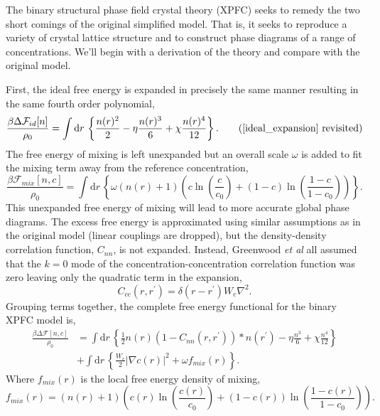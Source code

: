 \documentclass[showkeys, prb, reprint]{revtex4-1}
\renewcommand{\d}{\delta}       %
\newcommand{\F}{\mathcal{F}}    %
\renewcommand{\l}{\left}        %
\renewcommand{\r}{\right}       %
\newcommand{\f}{\frac}          %
\newcommand{\integrate}[1]{\int \mathrm{d}#1\,}
\begin{document}
The binary structural phase field crystal theory (XPFC) seeks to remedy the two
short comings of the original simplified model. That is, it seeks to reproduce
a variety of crystal lattice structure and to construct  phase diagrams of a
range of concentrations. We'll begin with a derivation of the theory and
compare with the original model.

First, the ideal free energy is expanded in precisely the same manner resulting
in the same fourth order polynomial,
%
\begin{equation}
    \f{\beta\Delta\F_{id}[n]}{\rho_0} = \integrate{r}
        \l\lbrace \f{n(r)^2}{2} - \eta \f{n(r)^3}{6} + \chi\f{n(r)^4}{12}
        \r\rbrace. \tag{\ref{ideal_expansion} revisited}
\end{equation}
%
The free energy of mixing is left unexpanded but an overall scale $\omega$ is
added to fit the mixing term away from the reference concentration,
%
\begin{equation}
    \f{\beta\F_{mix}[n, c]}{\rho_0} =
        \integrate{r} \l\lbrace \omega (n(r) + 1)\l( 
            c\ln\l(\f{c}{c_0}\r) + (1-c)\ln\l(\f{1-c}{1-c_0}\r) \r)\r\rbrace. 
\end{equation}
%
This unexpanded free energy of mixing will lead to more accurate global phase
diagrams. The excess free energy is approximated using similar assumptions as
in the original model (linear couplings are dropped), but the density-density
correlation function, $C_{nn}$, is not expanded. Instead, Greenwood \textit{et
al} all assumed that the $k=0$ mode of the concentration-concentration
correlation function was zero leaving only the quadratic term in the expansion,
%
\begin{equation}
    C_{cc}(r, r^\prime) = \d(r - r^\prime)W_c \nabla^2.
\end{equation}
%
Grouping terms together, the complete free energy functional for the binary
XPFC model is,
%
\begin{align}
    \f{\beta\Delta\F[n, c]}{\rho_0} &= \integrate{r} \l\lbrace
        \f{1}{2} n(r) \l(1 - C_{nn}(r, r^\prime)\r) \ast n(r^\prime)
        - \eta \f{n^3}{6} + \chi \f{n^4}{12} \r\rbrace \\
        &+ \integrate{r}\l\lbrace
            \f{W_c}{2}\l\vert \nabla c(r) \r\vert^2 + \omega f_{mix}(r)
            \r\rbrace. \nonumber
\end{align}
%
Where $f_{mix}(r)$ is the local free energy density of mixing,
%
\begin{equation}
    f_{mix}(r) = \l(n(r) + 1\r)\l( 
            c(r)\ln\l(\f{c(r)}{c_0}\r) + (1-c(r))\ln\l(\f{1-c(r)}{1-c_0}\r) \r).
\end{equation}
%
\end{document}
